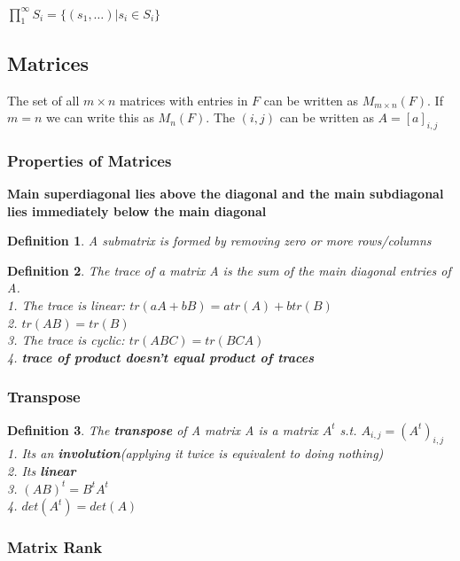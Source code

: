 \documentclass[12pt]{article}
\newtheorem{definition}{Definition}
\begin{document}
\(\prod_{1}^{\infty}S_i = \{(s_1, \ldots)| s_i \in S_i\} \)

\subsection{Matrices} 
The set of all $m \times n$ matrices with entries in $F$ can be written as $M_{m \times n} (F)$. If $m = n$ we can write this as $M_n (F)$. The $(i,j)$ can be written as $A = [a]_{i,j}$

\subsubsection{Properties of Matrices}
\textbf{Main superdiagonal lies above the diagonal and the main subdiagonal lies immediately below the main diagonal}

\begin{definition}
A submatrix is formed by removing zero or more rows/columns
\end{definition}


\begin{definition}
The trace of a matrix A is the sum of the main diagonal entries of A. \\

1. The trace is linear: $tr(aA + bB) = atr(A) + btr(B)$\\
2. $tr(AB) = tr(B)$\\
3. The trace is cyclic: $tr(ABC) = tr(BCA)$\\
4. \textbf{trace of product doesn't equal product of traces}
\end{definition}


\subsubsection{Transpose}
\begin{definition}
The \textbf{transpose} of A matrix A is a matrix $A^t$ s.t. $A_{i,j} = (A^{t})_{i,j}$\\

1. Its an \textbf{involution}(applying it twice is equivalent to doing nothing)\\
2. Its \textbf{linear}\\
3. $(AB)^t = B^t A^t $\\
4. $det(A^t) = det(A)$

\end{definition}

\subsubsection{Matrix Rank}
\end{document}
